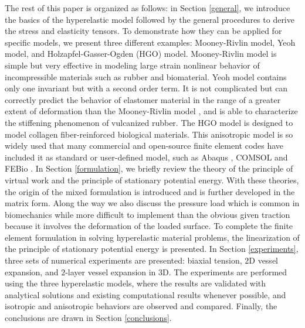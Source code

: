 The rest of this paper is organized as follows: in Section \ref{general}, we introduce the basics of the hyperelastic model followed by the general procedures to derive the stress and elasticity tensors. To demonstrate how they can be applied for specific models, we present three different examples: Mooney-Rivlin model, Yeoh model, and Holzapfel-Gasser-Ogden (HGO) model. Mooney-Rivlin model is simple but very effective in modeling large strain nonlinear behavior of incompressible materials such as rubber and biomaterial. Yeoh model contains only one invariant but with a second order term. It is not complicated but can correctly predict the behavior of elastomer material in the range of a greater extent of deformation than the Mooney-Rivlin model \cite{Gajewski}, and is able to characterize the stiffening phenomenon of vulcanized rubber. The HGO model is designed to model collagen fiber-reinforced biological materials. This anisotropic model is so widely used that many commercial and open-source finite element codes have included it as standard or user-defined model,  such as Abaqus \cite{Abaqus}, COMSOL \cite{COMSOL} and FEBio \cite{FEBio}. In Section \ref{formulation}, we briefly review the theory of the principle of virtual work and the principle of stationary potential energy. With these theories, the origin of the mixed formulation is introduced and is further developed in the matrix form. Along the way we also discuss the pressure load which is common in biomechanics while more difficult to implement than the obvious given traction because it involves the deformation of the loaded surface. To complete the finite element formulation in solving hyperelastic material problems, the linearization of the principle of stationary potential energy is presented. In Section \ref{experiments}, three sets of numerical experiments are presented: biaxial tension, $2$D vessel expansion, and $2$-layer vessel expansion in $3$D. The experiments are performed using the three hyperelastic models, where the results are validated with analytical solutions and existing computational results whenever possible, and isotropic and anisotropic behaviors are observed and compared. Finally, the conclusions are drawn in Section \ref{conclusions}.




 



